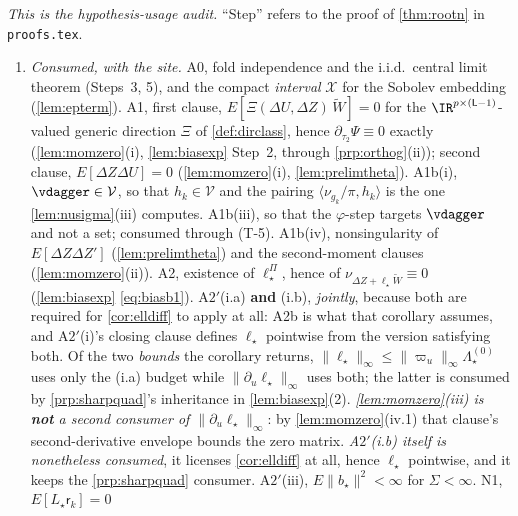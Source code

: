 \begin{remark}\label{rem:rootnhyp}
\emph{This is the hypothesis-usage audit.} ``Step'' refers to the proof of \cref{thm:rootn} in
\texttt{proofs.tex}.

\begin{enumerate}
\item[(1)] \emph{Consumed, with the site.} A0, fold independence and the i.i.d.\ central limit theorem
(Steps~3, 5), and the compact \emph{interval} $\mathcal X$ for the Sobolev embedding (\cref{lem:epterm}).
A1, first clause, $E[\Xi(\Delta U,\Delta Z)\,\widetilde W]=0$ for the
$\IR^{p\times(\mathsf L-1)}$-valued generic direction $\Xi$ of \cref{def:dirclass}, hence
$\partial_{\tau_2}\Psi\equiv0$ exactly (\cref{lem:momzero}(i), \cref{lem:biasexp} Step~2, through
\cref{prp:orthog}(ii)); second clause, $E[\Delta Z\Delta U]=0$ (\cref{lem:momzero}(i),
\cref{lem:prelimtheta}). A1b(i), $\vdagger\in\mathcal V$, so that $h_k\in\mathcal V$ and the pairing
$\langle\nu_{g_k}/\pi,h_k\rangle$ is the one \cref{lem:nusigma}(iii) computes. A1b(iii), so that the
$\varphi$-step targets $\vdagger$ and not a set; consumed through (T-5). A1b(iv), nonsingularity of
$E[\Delta Z\Delta Z']$ (\cref{lem:prelimtheta}) and the second-moment clauses (\cref{lem:momzero}(ii)).
A2, existence of $\ell^\Pi_\star$, hence of $\nu_{\Delta Z+\ell_\star\widetilde W}\equiv0$
(\cref{lem:biasexp} \eqref{eq:biasb1}). A$2'$(i.a) \textbf{and} (i.b), \emph{jointly}, because both are
required for \cref{cor:elldiff} to apply at all: A2b is what that corollary assumes, and A$2'$(i)'s closing
clause defines $\ell_\star$ pointwise from the version satisfying both. Of the two \emph{bounds} the
corollary returns, $\|\ell_\star\|_\infty\le\|\varpi_u\|_\infty\Lambda^{(0)}_\star$ uses only the (i.a)
budget while $\|\partial_u\ell_\star\|_\infty$ uses both; the latter is consumed by
\cref{prp:sharpquad}'s inheritance in \cref{lem:biasexp}(2). \emph{\cref{lem:momzero}\textup{(iii)} is
\textbf{not} a second consumer of $\|\partial_u\ell_\star\|_\infty$}: by
\cref{lem:momzero}\textup{(iv.1)} that clause's second-derivative envelope bounds the
zero matrix. \emph{A$2'$(i.b) itself is nonetheless consumed}, it
licenses \cref{cor:elldiff} at all, hence $\ell_\star$ pointwise, and it keeps the
\cref{prp:sharpquad} consumer.
A$2'$(iii), $E\|b_\star\|^{2}<\infty$ for $\Sigma<\infty$. N1, $E[L_\star\mathsf r_k]=0$

\end{enumerate}
\end{remark}
